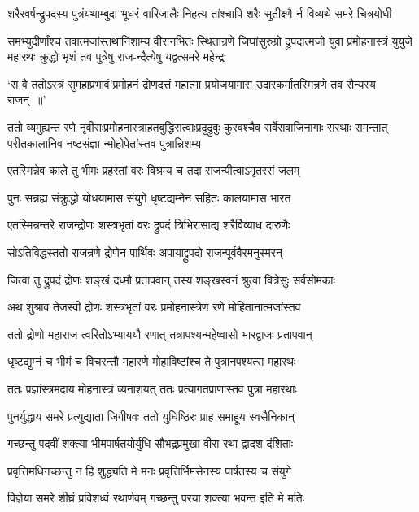 \twolineshloka
{शरैरवर्षन्द्रुपदस्य पुत्रंयथाम्बुदा भूधरं वारिजालैः}
{निहत्य तांश्चापि शरैः सुतीक्ष्णै-र्न विव्यथे समरे चित्रयोधी}


\fourlineindentedshloka
{समभ्युदीर्णांश्च तवात्मजांस्तथानिशाम्य वीरानभितः स्थितान्रणे}
{जिघांसुरुग्रो द्रुपदात्मजो युवा}
{प्रमोहनास्त्रं युयुजे महारथः}
{क्रुद्धो भृशं तव पुत्रेषु राज-न्दैत्येषु यद्वत्समरे महेन्द्रः}


\twolineshloka
{`स वै ततोऽस्त्रं सुमहाप्रभावं'प्रमोहनं द्रोणदत्तं महात्मा}
{प्रयोजयामास उदारकर्मातस्मिन्रणे तव सैन्यस्य राजन् ॥'}


\twolineshloka
{ततो व्यमुह्यन्त रणे नृवीराःप्रमोहनास्त्राहतबुद्धिसत्वाःप्रदुद्रुवुः कुरवश्चैव सर्वेसवाजिनागाः सरथाः समन्तात्}
{परीतकालानिव नष्टसंज्ञा-न्मोहोपेतांस्तव पुत्रान्निशम्य}


\twolineshloka
{एतस्मिन्नेव काले तु भीमः प्रहरतां वरः}
{विश्रम्य च तदा राजन्पीत्वाऽमृतरसं जलम्}


\twolineshloka
{पुनः सन्नह्य संक्रुद्धो योधयामास संयुगे}
{धृष्टद्यम्नेन सहितः कालयामास भारत}


\twolineshloka
{एतस्मिन्नन्तरे राजन्द्रोणः शस्त्रभृतां वरः}
{द्रुपदं त्रिभिरासाद्य शरैर्विव्याध दारुणैः}


\threelineshloka
{सोऽतिविद्धस्ततो राजन्रणे द्रोणेन पार्थिवः}
{अपायाद्द्रुपदो राजन्पूर्ववैरमनुस्मरन्}
{}


\twolineshloka
{जित्वा तु द्रुपदं द्रोणः शङ्खं दध्मौ प्रतापवान्}
{तस्य शङ्खस्वनं श्रुत्वा वित्रेसुः सर्वसोमकाः}


\twolineshloka
{अथ शुश्राव तेजस्वी द्रोणः शस्त्रभृतां वरः}
{प्रमोहनास्त्रेण रणे मोहितानात्मजांस्तव}


\twolineshloka
{ततो द्रोणो महाराज त्वरितोऽभ्याययौ रणात्}
{तत्रापश्यन्महेष्वासो भारद्वाजः प्रतापवान्}


\twolineshloka
{धृष्टद्युम्नं च भीमं च विचरन्तौ महारणे}
{मोहाविष्टांश्च ते पुत्रानपश्यत्स महारथः}


\twolineshloka
{ततः प्रज्ञांस्त्रमदाय मोहनास्त्रं व्यनाशयत्}
{ततः प्रत्यागतप्राणास्तव पुत्रा महारथाः}


\twolineshloka
{पुनर्युद्धाय समरे प्रत्युद्याता जिगीषवः}
{ततो युधिष्ठिरः प्राह समाहूय स्वसैनिकान्}


\twolineshloka
{गच्छन्तु पदवीं शक्त्या भीमपार्षतयोर्युधि}
{सौभद्रप्रमुखा वीरा रथा द्वादश दंशिताः}


\twolineshloka
{प्रवृत्तिमधिगच्छन्तु न हि शुद्ध्यति मे मनः}
{प्रवृत्तिर्भिमसेनस्य पार्षतस्य च संयुगे}


\twolineshloka
{विज्ञेया समरे शीघ्रं प्रविशध्वं रथार्णवम्}
{गच्छन्तु परया शक्त्या भवन्त इति मे मतिः}


